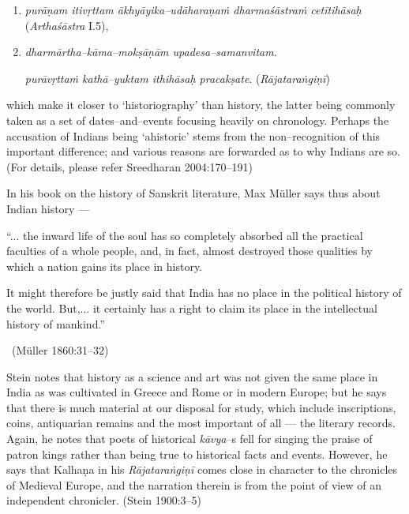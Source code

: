 \begin{enumerate}
\item \textit{purāṇam itivṛttam ākhyāyika–udāharaṇaṁ dharmaśāstraṁ cetītihāsaḥ} (\textit{Arthaśāstra} I.5),

 \item 
 \textit{dharmārtha–kāma–mokṣāṇām upadesa–samanvitam}.

 \textit{purāvṛttaṁ kathā–yuktam ithihāsaḥ pracakṣate}. (\textit{Rājataraṅgiṇī})

\end{enumerate}

which make it closer to ‘historiography’ than history, the latter being commonly taken as a set of dates–and–events focusing heavily on chronology. Perhaps the accusation of Indians being ‘ahistoric’ stems from the non–recognition of this important difference; and various reasons are forwarded as to why Indians are so. (For details, please refer Sreedharan 2004:170–191)

In his book on the history of Sanskrit literature, Max Müller says thus about Indian history —

\begin{myquote}
“... the inward life of the soul has so completely absorbed all the practical faculties of a whole people, and, in fact, almost destroyed those qualities by which a nation gains its place in history.
\end{myquote}

\begin{myquote}
It might therefore be justly said that India has no place in the political history of the world. But,... it certainly has a right to claim its place in the intellectual history of mankind.” 

~\hfill (Müller 1860:31–32)
\end{myquote}

Stein notes that history as a science and art was not given the same place in India as was cultivated in Greece and Rome or in modern Europe; but he says that there is much material at our disposal for study, which include inscriptions, coins, antiquarian remains and the most important of all — the literary records. Again, he notes that poets of historical \textit{kāvya}–s fell for singing the praise of patron kings rather than being true to historical facts and events. However, he says that Kalhaṇa in his \textit{Rājataraṅgiṇī} comes close in character to the chronicles of Medieval Europe, and the narration therein is from the point of view of an independent chronicler. (Stein 1900:3–5)


